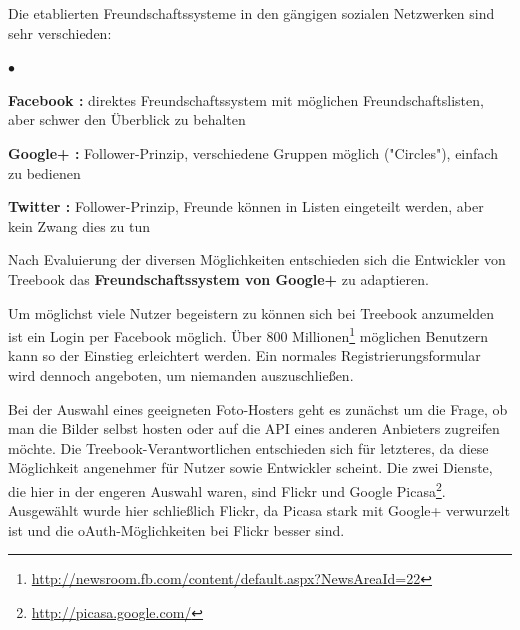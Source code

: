 \documentclass[10pt,a4paper]{book}
\begin{document}
Die etablierten Freundschaftssysteme in den gängigen sozialen Netzwerken sind sehr verschieden:
\begin{list}{$\bullet$}{}
\item \textbf{Facebook :} direktes Freundschaftssystem mit möglichen Freundschaftslisten, aber schwer den Überblick zu behalten
\item \textbf{Google+ :} Follower-Prinzip, verschiedene Gruppen möglich ("Circles"), einfach zu bedienen
\item \textbf{Twitter :} Follower-Prinzip, Freunde können in Listen eingeteilt werden, aber kein Zwang dies zu tun
\end{list}
Nach Evaluierung der diversen Möglichkeiten entschieden sich die Entwickler von Treebook das \textbf{Freundschaftssystem von Google+} zu adaptieren.

Um möglichst viele Nutzer begeistern zu können sich bei Treebook anzumelden ist ein Login per Facebook möglich. Über 800 Millionen\footnote{\href{http://newsroom.fb.com/content/default.aspx?NewsAreaId=22}{http://newsroom.fb.com/content/default.aspx?NewsAreaId=22}} möglichen Benutzern kann so der Einstieg erleichtert werden. Ein normales Registrierungsformular wird dennoch angeboten, um niemanden auszuschließen.

Bei der Auswahl eines geeigneten Foto-Hosters geht es zunächst um die Frage, ob man die Bilder selbst hosten oder auf die API eines anderen Anbieters zugreifen möchte. Die Treebook-Verantwortlichen entschieden sich für letzteres, da diese Möglichkeit angenehmer für Nutzer sowie Entwickler scheint. Die zwei Dienste, die hier in der engeren Auswahl waren, sind Flickr und Google Picasa\footnote{\href{http://picasa.google.com/}{http://picasa.google.com/}}. Ausgewählt wurde hier schließlich Flickr, da Picasa stark mit Google+ verwurzelt ist und die oAuth-Möglichkeiten bei Flickr besser sind.  
\end{document}
